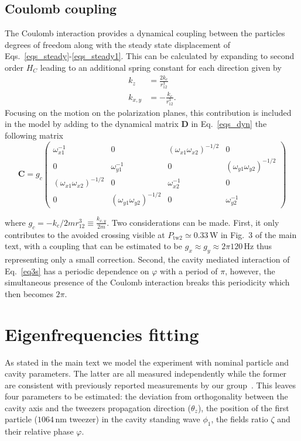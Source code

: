 \documentclass[aps,PRA,%
 amsmath,amssymb,
singlecolumn,
notitlepage,superscriptaddress,groupedaddress]{revtex4}
\begin{document}
\subsection{Coulomb coupling}\label{subscoulomb}
The Coulomb interaction provides a dynamical coupling between the particles degrees of freedom along with the steady state displacement of Eqs.~\ref{eqs_steady}-\ref{eqs_steady1}. This can be calculated by expanding to second order $H_C$ leading to an additional spring constant for each direction given by
\begin{align}
       k_z&=\frac{2 k_c}{r_{12}^3}\\
    k_{x,y}&=-\frac{k_c}{r_{12}^3}.
\end{align}
Focusing on the motion on the polarization planes, this contribution is included in the model by adding to the dynamical matrix $\mathbf{D}$ in Eq.~\ref{eqs_dyn} the following matrix
\begin{equation}
\mathbf{C}= g_c\begin{pmatrix}
\omega_{x1}^{-1} & 0 & (\omega_{x1}\omega_{x2})^{-1/2} & 0 \\
0 & \omega_{y1}^{-1} & 0 & (\omega_{y1}\omega_{y2})^{-1/2} \\
(\omega_{x1}\omega_{x2})^{-1/2} & 0 & \omega_{x2}^{-1} & 0 \\
0 & (\omega_{y1}\omega_{y2})^{-1/2} & 0 & \omega_{y2}^{-1}
\end{pmatrix}
\end{equation}

\noindent where $g_c=-k_c/2mr_{12}^3\equiv \frac{k_{x,y}}{2m}$. Two considerations can be made. First, it only contributes to the avoided crossing visible at $P_{\mathrm{tw2}}\simeq0.33$\,W in Fig.~3 of the main text, with a coupling that can be estimated to be $g_x\approx g_y\approx2\pi120$\,Hz thus representing only a small correction. Second, the cavity mediated interaction of Eq.~\ref{eq3s} has a periodic dependence on $\varphi$ with a period of $\pi$, however, the simultaneous presence of the Coulomb interaction breaks this periodicity which then becomes $2\pi$. 



\section{Eigenfrequencies fitting}
As stated in the main text we model the experiment with nominal particle and cavity parameters. The latter are all measured independently while the former are consistent with previously reported measurements by our group~\cite{Ranfagni2021Two-dimensional}. This leaves four parameters to be estimated: the deviation from orthogonality between the cavity axis and the tweezers propagation direction ($\theta_z$), the position of the first particle ($1064$\,nm tweezer) in the cavity standing wave $\phi_1$, the fields ratio $\zeta$ and their relative phase $\varphi$.
\end{document}
